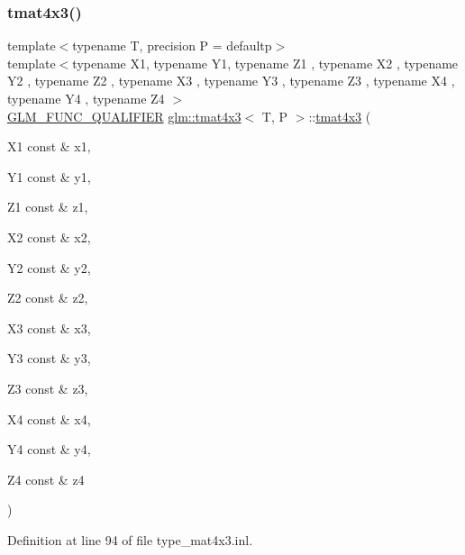 \subsubsection{\texorpdfstring{tmat4x3()}{tmat4x3()}\hspace{0.1cm}{\footnotesize\ttfamily [20/22]}}
{\footnotesize\ttfamily template$<$typename T, precision P = defaultp$>$ \\
template$<$typename X1, typename Y1, typename Z1 , typename X2 , typename Y2 , typename Z2 , typename X3 , typename Y3 , typename Z3 , typename X4 , typename Y4 , typename Z4 $>$ \\
\mbox{\hyperlink{setup_8hpp_a33fdea6f91c5f834105f7415e2a64407}{G\+L\+M\+\_\+\+F\+U\+N\+C\+\_\+\+Q\+U\+A\+L\+I\+F\+I\+ER}} \mbox{\hyperlink{structglm_1_1tmat4x3}{glm\+::tmat4x3}}$<$ T, P $>$\+::\mbox{\hyperlink{structglm_1_1tmat4x3}{tmat4x3}} (\begin{DoxyParamCaption}\item[{X1 const \&}]{x1,  }\item[{Y1 const \&}]{y1,  }\item[{Z1 const \&}]{z1,  }\item[{X2 const \&}]{x2,  }\item[{Y2 const \&}]{y2,  }\item[{Z2 const \&}]{z2,  }\item[{X3 const \&}]{x3,  }\item[{Y3 const \&}]{y3,  }\item[{Z3 const \&}]{z3,  }\item[{X4 const \&}]{x4,  }\item[{Y4 const \&}]{y4,  }\item[{Z4 const \&}]{z4 }\end{DoxyParamCaption})}



Definition at line 94 of file type\+\_\+mat4x3.\+inl.

\mbox{\label{structglm_1_1tmat4x3_a39c67aaaba4ee82e36a172a8704a4920}} 
